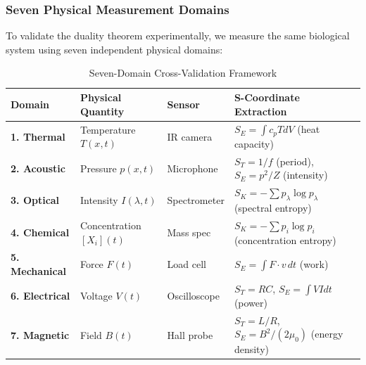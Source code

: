 \documentclass[11pt,a4paper]{article}
\begin{document}
\subsubsection{Seven Physical Measurement Domains}

To validate the duality theorem experimentally, we measure the same biological system using seven independent physical domains\cite{sachikonye2024grand}:

\begin{table}[H]
\centering
\caption{Seven-Domain Cross-Validation Framework}
\small
\begin{tabular}{lllp{5cm}}
\toprule
\textbf{Domain} & \textbf{Physical Quantity} & \textbf{Sensor} & \textbf{S-Coordinate Extraction} \\
\midrule
\textbf{1. Thermal} & Temperature $T(x,t)$ & IR camera & $S_E = \int c_p T dV$ (heat capacity) \\
\textbf{2. Acoustic} & Pressure $p(x,t)$ & Microphone & $S_T = 1/f$ (period), $S_E = p^2/Z$ (intensity) \\
\textbf{3. Optical} & Intensity $I(\lambda,t)$ & Spectrometer & $S_K = -\sum p_\lambda \log p_\lambda$ (spectral entropy) \\
\textbf{4. Chemical} & Concentration $[X_i](t)$ & Mass spec & $S_K = -\sum p_i \log p_i$ (concentration entropy) \\
\textbf{5. Mechanical} & Force $F(t)$ & Load cell & $S_E = \int F \cdot v \, dt$ (work) \\
\textbf{6. Electrical} & Voltage $V(t)$ & Oscilloscope & $S_T = RC$, $S_E = \int VI dt$ (power) \\
\textbf{7. Magnetic} & Field $B(t)$ & Hall probe & $S_T = L/R$, $S_E = B^2/(2\mu_0)$ (energy density) \\
\bottomrule
\end{tabular}
\end{table}
\end{document}
